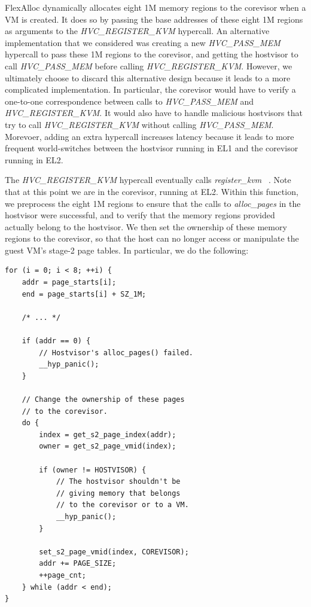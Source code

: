 FlexAlloc dynamically allocates eight 1M memory regions to the corevisor when a
VM is created. It does so by passing the base addresses of these eight 1M
regions as arguments to the \textit{HVC\_REGISTER\_KVM} hypercall. An alternative
implementation that we considered was creating a new \textit{HVC\_PASS\_MEM} hypercall to pass these
1M regions to the corevisor, and getting the hostvisor to call \textit{HVC\_PASS\_MEM}
before calling \textit{HVC\_REGISTER\_KVM}. However, we ultimately choose to
discard this alternative design because it leads to a more complicated
implementation. In particular, the corevisor would have to verify a one-to-one
correspondence between calls to \textit{HVC\_PASS\_MEM} and \textit{HVC\_REGISTER\_KVM}.
It would also have to handle malicious hostvisors that try to call
\textit{HVC\_REGISTER\_KVM} without calling \textit{HVC\_PASS\_MEM}. Morevoer,
adding an extra hypercall increases latency because it leads to more frequent
world-switches between the hostvisor running in EL1 and the corevisor running in EL2.

The \textit{HVC\_REGISTER\_KVM} hypercall eventually calls \textit{register\_kvm}
~\cite{el2.c}. Note that at this point we are in the corevisor, running at EL2.
Within this function, we preprocess the eight 1M regions to ensure that the
calls to \textit{alloc\_pages} in the hostvisor were successful, and to verify
that the memory regions provided actually belong to the hostvisor. We then set
the ownership of these memory regions to the corevisor, so that the host can
no longer access or manipulate the guest VM's stage-2 page tables. In particular,
we do the following:

\begin{verbatim}
for (i = 0; i < 8; ++i) {
    addr = page_starts[i];
    end = page_starts[i] + SZ_1M;

    /* ... */

    if (addr == 0) {
        // Hostvisor's alloc_pages() failed.
        __hyp_panic();
    }

    // Change the ownership of these pages
    // to the corevisor.
    do {
        index = get_s2_page_index(addr);
        owner = get_s2_page_vmid(index);

        if (owner != HOSTVISOR) {
            // The hostvisor shouldn't be
            // giving memory that belongs
            // to the corevisor or to a VM.
            __hyp_panic();
        }

        set_s2_page_vmid(index, COREVISOR);
        addr += PAGE_SIZE;
        ++page_cnt;
    } while (addr < end);
}
\end{verbatim}

